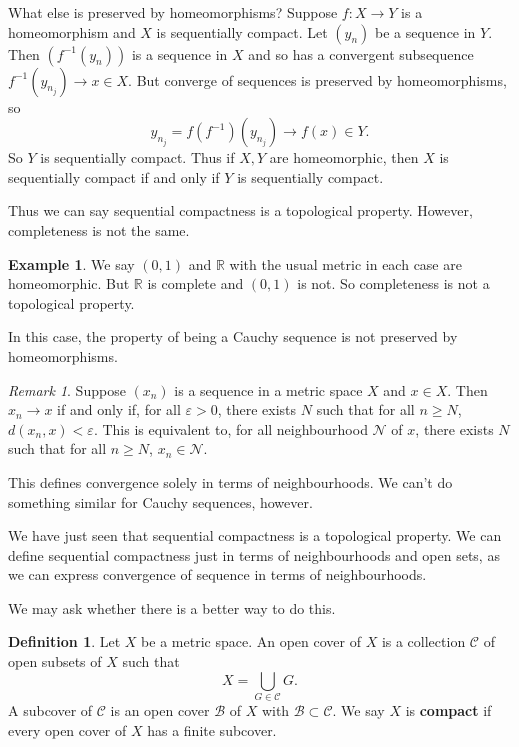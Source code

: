 \documentclass[12pt]{article}
\theoremstyle{definition}
\newtheorem{definition}{Definition}[section]
\newtheorem{example}{Example}[section]
\theoremstyle{remark}
\newtheorem*{remark}{Remark}
\begin{document}
What else is preserved by homeomorphisms? Suppose $f : X \to Y$ is a homeomorphism and $X$ is sequentially compact. Let $(y_n)$ be a sequence in $Y$. Then $(f^{-1}(y_n))$ is a sequence in $X$ and so has a convergent subsequence $f^{-1}(y_{n_j}) \to x \in X$. But converge of sequences is preserved by homeomorphisms, so
\[
	y_{n_j} = f(f^{-1})(y_{n_j}) \to f(x) \in Y
.\]
So $Y$ is sequentially compact. Thus if $X, Y$ are homeomorphic, then $X$ is sequentially compact if and only if $Y$ is sequentially compact.

Thus we can say sequential compactness is a topological property. However, completeness is not the same.

\begin{adjustbox}{minipage = \columnwidth - 25.5pt, margin=1em, frame=1pt, margin=0em}
\begin{example}
	We say $(0, 1)$ and $\mathbb{R}$ with the usual metric in each case are homeomorphic. But $\mathbb{R}$ is complete and $(0, 1)$ is not. So completeness is not a topological property.
\end{example}
\end{adjustbox}

In this case, the property of being a Cauchy sequence is not preserved by homeomorphisms.

\begin{remark}
	Suppose $(x_n)$ is a sequence in a metric space $X$ and $x \in X$. Then $x_n \to x$ if and only if, for all $\varepsilon > 0$, there exists $N$ such that for all $n \geq N$, $d(x_n, x) < \varepsilon$. This is equivalent to, for all neighbourhood $\mathcal{N}$ of $x$, there exists $N$ such that for all $n \geq N$, $x_n \in \mathcal{N}$.

	This defines convergence solely in terms of neighbourhoods. We can't do something similar for Cauchy sequences, however.
\end{remark}

We have just seen that sequential compactness is a topological property. We can define sequential compactness just in terms of neighbourhoods and open sets, as we can express convergence of sequence in terms of neighbourhoods.

We may ask whether there is a better way to do this.

\begin{definition}
	Let $X$ be a metric space. An open cover of $X$ is a collection $\mathcal{C}$ of open subsets of $X$ such that
	\[
	X = \bigcup_{G \in \mathcal{C}}G
	.\]
	A subcover of $\mathcal{C}$ is an open cover $\mathcal{B}$ of $X$ with $\mathcal{B} \subset \mathcal{C}$. We say $X$ is \textbf{compact} if every open cover of $X$ has a finite subcover.
\end{definition}
\end{document}
